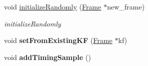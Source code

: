 \begin{DoxyCompactItemize}
\item 
void \hyperlink{classlsd__slam_1_1_depth_map_ad43f276ef4edee8420460b452929aad4}{initialize\-Randomly} (\hyperlink{classlsd__slam_1_1_frame}{Frame} $\ast$new\-\_\-frame)
\begin{DoxyCompactList}\small\item\em initialize\-Randomly \end{DoxyCompactList}\item 
\hypertarget{classlsd__slam_1_1_depth_map_a79d83f1d1911274ab55d95ebf5e3dab5}{void {\bfseries set\-From\-Existing\-K\-F} (\hyperlink{classlsd__slam_1_1_frame}{Frame} $\ast$kf)}\label{classlsd__slam_1_1_depth_map_a79d83f1d1911274ab55d95ebf5e3dab5}

\item 
\hypertarget{classlsd__slam_1_1_depth_map_aaad7df1f66aea8294bfddd8bc929bc00}{void {\bfseries add\-Timing\-Sample} ()}\label{classlsd__slam_1_1_depth_map_aaad7df1f66aea8294bfddd8bc929bc00}

\end{DoxyCompactItemize}
